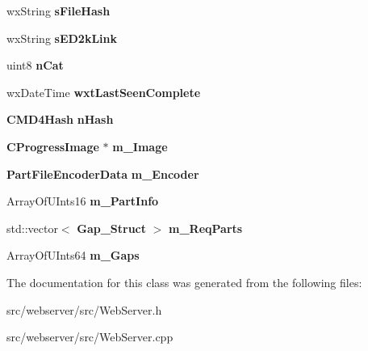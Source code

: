\begin{DoxyCompactItemize}
\item 
wxString {\bfseries sFileHash}\label{classDownloadFile_ab0ddb59766db53e829518cfafb98662f}

\item 
wxString {\bfseries sED2kLink}\label{classDownloadFile_a09c824387c92c21d72f6140da702d199}

\item 
uint8 {\bfseries nCat}\label{classDownloadFile_a24a5d3b434dcad0f5574f1193df003a0}

\item 
wxDateTime {\bfseries wxtLastSeenComplete}\label{classDownloadFile_a20dd2c363ff5de5998bcbcd353fe7fe2}

\item 
{\bf CMD4Hash} {\bfseries nHash}\label{classDownloadFile_a7cac1754411f985bf6d8d09c281d4d7e}

\item 
{\bf CProgressImage} $\ast$ {\bfseries m\_\-Image}\label{classDownloadFile_ab8289f639abd56929fd52708aa18ae44}

\item 
{\bf PartFileEncoderData} {\bfseries m\_\-Encoder}\label{classDownloadFile_aca27659f1385d2cead1031ec65297590}

\item 
ArrayOfUInts16 {\bfseries m\_\-PartInfo}\label{classDownloadFile_a17738141285adb8049705b5407341589}

\item 
std::vector$<$ {\bf Gap\_\-Struct} $>$ {\bfseries m\_\-ReqParts}\label{classDownloadFile_a7bba1c75201c759e12660c5637b404e1}

\item 
ArrayOfUInts64 {\bfseries m\_\-Gaps}\label{classDownloadFile_afab8055fb5ad0bc0cdb4a39d0141534d}

\end{DoxyCompactItemize}


The documentation for this class was generated from the following files:\begin{DoxyCompactItemize}
\item 
src/webserver/src/WebServer.h\item 
src/webserver/src/WebServer.cpp\end{DoxyCompactItemize}
